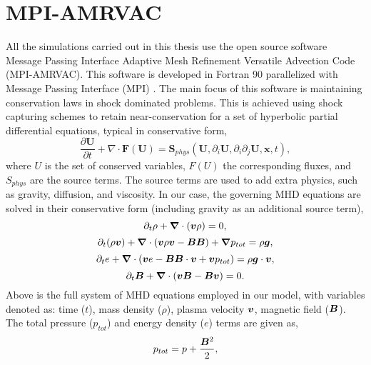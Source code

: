 \section{MPI-AMRVAC}
All the simulations carried out in this thesis use the open source software Message Passing Interface Adaptive Mesh Refinement Versatile Advection Code (MPI-AMRVAC). This software is developed in Fortran 90 parallelized with Message Passing Interface (MPI) \citep{toth1996ApLC34245T,Keppens_2012,Porth_2014,Xia_2017}. The main focus of this software is maintaining conservation laws in shock dominated problems. This is achieved using shock capturing schemes to retain near-conservation for a set of hyperbolic partial differential equations, typical in conservative form,
\begin{equation}\label{AMRVAC_stlye}
\frac{\partial \boldsymbol{U}}{\partial t} + \nabla \cdot \boldsymbol{F}(\boldsymbol{U}) = \boldsymbol{S}_{phys} (\boldsymbol{U}, \partial_{i} \boldsymbol{U}, \partial_i \partial_j \boldsymbol{U},\boldsymbol{x},t) ,
\end{equation}
where $U$ is the set of conserved variables, $F(U)$ the corresponding fluxes, and $S_{phys}$ are the source terms. The source terms are used to add extra physics, such as gravity, diffusion, and viscosity. In our case, the governing MHD equations are solved in their conservative form (including gravity as an additional source term),
\begin{equation} \label{eq1}
\partial_t \rho + \boldsymbol{\nabla} \cdot (\boldsymbol{v} \rho) = 0,
\end{equation}   
\begin{equation}\label{eq2}
\partial_t (\rho \boldsymbol{v})  + \boldsymbol{\nabla} \cdot ( \boldsymbol{v} \rho \boldsymbol{v} - \boldsymbol{BB}) + \boldsymbol{\nabla} p_{tot} = \rho \boldsymbol{g},
\end{equation}
\begin{equation}\label{eq3}
\partial_t e + \boldsymbol{\nabla} \cdot (\boldsymbol{v} e - \boldsymbol{BB}\cdot\boldsymbol{v}+\boldsymbol{v}p_{tot}) = \rho \boldsymbol{g} \cdot \boldsymbol{v},
\end{equation}
\begin{equation}\label{eq4}
\partial_t \boldsymbol{B} + \boldsymbol{\nabla} \cdot (\boldsymbol{vB}-\boldsymbol{Bv} ) = 0.
\end{equation}
Above is the full system of MHD equations employed in our model, with variables denoted as: time ($t$), mass density ($\rho$), plasma velocity $\boldsymbol{v}$, magnetic field ($\boldsymbol{B}$). The total pressure ($p_{tot}$) and energy density ($e$) terms are given as,
\begin{equation}
p_{tot} = p+\frac{\boldsymbol{B}^2}{2},
\end{equation}
